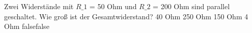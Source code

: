     {Zwei Widerstände mit $R\_1$ = 50 Ohm und $R\_2$ = 200 Ohm sind parallel geschaltet. Wie groß ist der Gesamtwiderstand?}
    {40 Ohm}
    {250 Ohm}
    {150 Ohm}
    {4 Ohm}
    {false}{false}